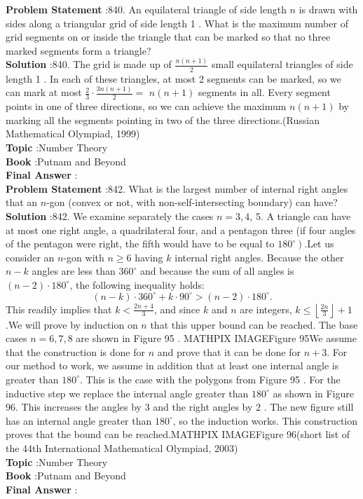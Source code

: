 \documentclass[10pt]{article}
\begin{document}
\textbf{Problem Statement} :840. An equilateral triangle of side length $n$ is drawn with sides along a triangular grid of side length 1 . What is the maximum number of grid segments on or inside the triangle that can be marked so that no three marked segments form a triangle?\\
\textbf{Solution} :840. The grid is made up of $\frac{n(n+1)}{2}$ small equilateral triangles of side length 1 . In each of these triangles, at most 2 segments can be marked, so we can mark at most $\frac{2}{3} \cdot \frac{3 n(n+1)}{2}=$ $n(n+1)$ segments in all. Every segment points in one of three directions, so we can achieve the maximum $n(n+1)$ by marking all the segments pointing in two of the three directions.(Russian Mathematical Olympiad, 1999)\\
\textbf{Topic} :Number Theory\\
\textbf{Book} :Putnam and Beyond\\
\textbf{Final Answer} :\\


\textbf{Problem Statement} :842. What is the largest number of internal right angles that an $n$-gon (convex or not, with non-self-intersecting boundary) can have?\\
\textbf{Solution} :842. We examine separately the cases $n=3,4$, 5. A triangle can have at most one right angle, a quadrilateral four, and a pentagon three (if four angles of the pentagon were right, the fifth would have to be equal to $\left.180^{\circ}\right)$.Let us consider an $n$-gon with $n \geq 6$ having $k$ internal right angles. Because the other $n-k$ angles are less than $360^{\circ}$ and because the sum of all angles is $(n-2) \cdot 180^{\circ}$, the following inequality holds:$$ (n-k) \cdot 360^{\circ}+k \cdot 90^{\circ}>(n-2) \cdot 180^{\circ} . $$This readily implies that $k<\frac{2 n+4}{3}$, and since $k$ and $n$ are integers, $k \leq\left\lfloor\frac{2 n}{3}\right\rfloor+1$.We will prove by induction on $n$ that this upper bound can be reached. The base cases $n=6,7,8$ are shown in Figure 95 .
MATHPIX IMAGEFigure 95We assume that the construction is done for $n$ and prove that it can be done for $n+3$. For our method to work, we assume in addition that at least one internal angle is greater than $180^{\circ}$. This is the case with the polygons from Figure 95 . For the inductive step we replace the internal angle greater than $180^{\circ}$ as shown in Figure 96. This increases the angles by 3 and the right angles by 2 . The new figure still has an internal angle greater than $180^{\circ}$, so the induction works. This construction proves that the bound can be reached.MATHPIX IMAGEFigure 96(short list of the 44th International Mathematical Olympiad, 2003)\\
\textbf{Topic} :Number Theory\\
\textbf{Book} :Putnam and Beyond\\
\textbf{Final Answer} :\\
\end{document}
